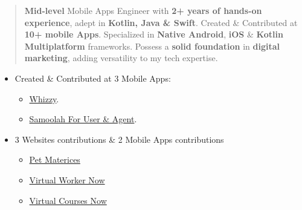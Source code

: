 \documentclass[10pt,a4paper,ragged2e,withhyper]{altacv}
\begin{document}

    \makecvheader


    \begin{quote}

        \textbf{Mid-level}  Mobile Apps Engineer with \textbf{2+ years of hands-on experience},
        adept in \textbf{Kotlin, Java \& Swift}.
        \linebreak Created \& Contributed at \textbf{10+ mobile Apps}.
        Specialized in \textbf{Native Android}, \textbf{iOS} \& \textbf{Kotlin Multiplatform} frameworks.
        Possess a \textbf{solid foundation} in \textbf{digital marketing}, adding versatility to my tech expertise.
    \end{quote}



    \begin{itemize}
        \item Created \& Contributed at 3 Mobile Apps:
        \begin{itemize}
            \item \hyperlink{whizzy}{Whizzy}.
            \item \hyperlink{samoolah}{Samoolah For User \& Agent}.
        \end{itemize}
    \end{itemize}
    \divider


    \begin{itemize}
        \item 3 Websites contributions \& 2 Mobile Apps contributions
        \begin{itemize}
            \item \hyperlink{pet_materices}{Pet Materices}
            \item \href{https://virtualworkernow.com/} {Virtual Worker Now}
            \item \href{https://virtualcoursesnow.com/vcn-home/} {Virtual Courses Now}
        \end{itemize}
    \end{itemize}
    \divider
\end{document}
